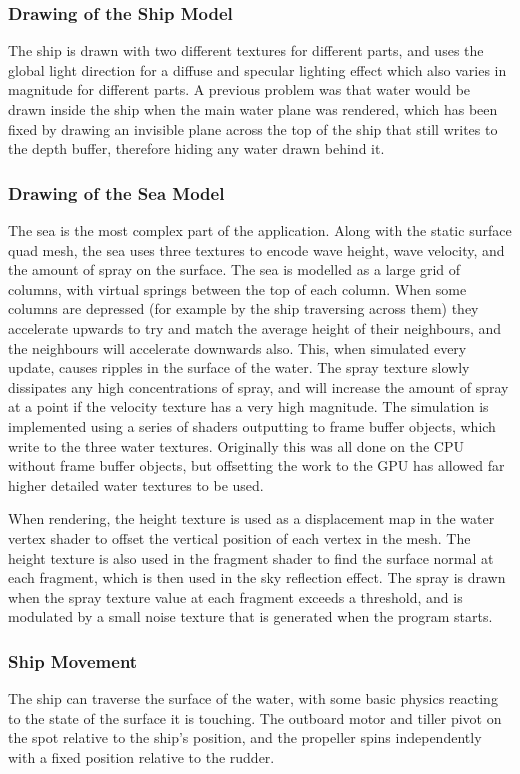 \documentclass[a4paper,11pt]{article}
\begin{document}
\subsubsection{Drawing of the Ship Model}
The ship is drawn with two different textures for different parts, and uses the global light direction for a diffuse and specular lighting effect which also varies in magnitude for different parts. A previous problem was that water would be drawn inside the ship when the main water plane was rendered, which has been fixed by drawing an invisible plane across the top of the ship that still writes to the depth buffer, therefore hiding any water drawn behind it.

\subsubsection{Drawing of the Sea Model}
The sea is the most complex part of the application. Along with the static surface quad mesh, the sea uses three textures to encode wave height, wave velocity, and the amount of spray on the surface. The sea is modelled as a large grid of columns, with virtual springs between the top of each column. When some columns are depressed (for example by the ship traversing across them) they accelerate upwards to try and match the average height of their neighbours, and the neighbours will accelerate downwards also. This, when simulated every update, causes ripples in the surface of the water. The spray texture slowly dissipates any high concentrations of spray, and will increase the amount of spray at a point if the velocity texture has a very high magnitude. The simulation is implemented using a series of shaders outputting to frame buffer objects, which write to the three water textures. Originally this was all done on the CPU without frame buffer objects, but offsetting the work to the GPU has allowed far higher detailed water textures to be used.

When rendering, the height texture is used as a displacement map in the water vertex shader to offset the vertical position of each vertex in the mesh. The height texture is also used in the fragment shader to find the surface normal at each fragment, which is then used in the sky reflection effect. The spray is drawn when the spray texture value at each fragment exceeds a threshold, and is modulated by a small noise texture that is generated when the program starts.

\subsubsection{Ship Movement}
The ship can traverse the surface of the water, with some basic physics reacting to the state of the surface it is touching. The outboard motor and tiller pivot on the spot relative to the ship's position, and the propeller spins independently with a fixed position relative to the rudder.
\end{document}
